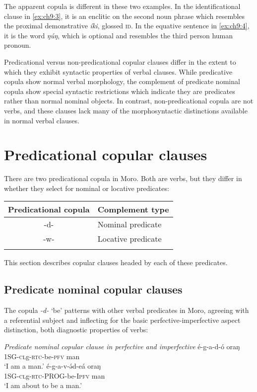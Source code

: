 	
The apparent copula is different in these two examples. In the identificational clause in \ref{ex:ch9:3}, it is an enclitic on the second noun phrase which resembles the proximal demonstrative \textit{íki}, glossed \textsc{id}. In the equative sentence in \ref{ex:ch9:4}, it is the word \textit{ŋúŋ}, which is optional and resembles the third person human pronoun.

Predicational versus non-predicational copular clauses differ in the extent to which they exhibit syntactic properties of verbal clauses. While predicative copula show normal verbal morphology, the complement of predicate nominal copula show special syntactic restrictions which indicate they are predicates rather than normal nominal objects. In contrast, non-predicational copula are not verbs, and these clauses lack many of the morphosyntactic distinctions available in normal verbal clauses.


\section{Predicational copular clauses}

There are two predicational copula in Moro. Both are verbs, but they differ in whether they select for nominal or locative predicates: 

\ea  \label{ex:ch9:5}
\begin{tabular}[t]{cl}
\lsptoprule
Predicational copula & Complement type \\
\midrule 
-d- & Nominal predicate\\
-w- & Locative predicate \\ 
\lspbottomrule
\end{tabular}
\z 

This section describes copular clauses headed by each of these predicates.

\subsection{Predicate nominal copular clauses}\label{sec:ch9:nompred}

The copula \textit{-d-} `be' patterns with other verbal predicates in Moro, agreeing with a referential subject and inflecting for the basic perfective-imperfective aspect distinction, both diagnostic properties of verbs:

\ea \textit{Predicate nominal copular clause in perfective and imperfective} \label{ex:ch9:6}
	\ea  \gll  é-g-a-d-ó oraŋ\\
		 1SG-\textsc{cl}g-\textsc{rtc}-be-\textsc{pfv} man\\
		 \glt  ‘I am a man.’	
	\ex  \gll é-g-a-v-ə́d-eá oraŋ\\
		 1SG-\textsc{cl}g-\textsc{rtc}-PROG-be-I\textsc{pfv} man\\		
	  	\glt ‘I am about to be a man.’  \z \z 
	  	
